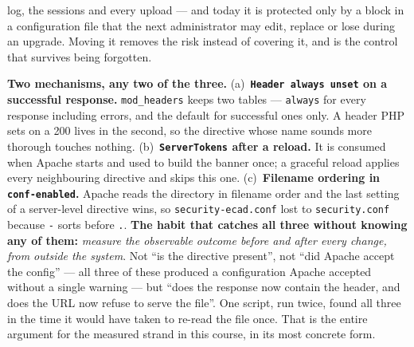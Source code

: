 \begin{ans}
        log, the sessions and every upload --- and today it is protected only
        by a block in a configuration file that the next administrator may
        edit, replace or lose during an upgrade. Moving it removes the risk
        instead of covering it, and is the control that survives being
        forgotten.
  \item \textbf{Two mechanisms, any two of the three.}
        (a)~\textbf{\texttt{Header always unset} on a successful response.}
        \texttt{mod\_headers} keeps two tables --- \texttt{always} for every
        response including errors, and the default for successful ones only.
        A header PHP sets on a 200 lives in the second, so the directive whose
        name sounds more thorough touches nothing.
        (b)~\textbf{\texttt{ServerTokens} after a reload.} It is consumed when
        Apache starts and used to build the banner once; a graceful reload
        applies every neighbouring directive and skips this one.
        (c)~\textbf{Filename ordering in \texttt{conf-enabled}.} Apache reads
        the directory in filename order and the last setting of a server-level
        directive wins, so \texttt{security-ecad.conf} lost to
        \texttt{security.conf} because \texttt{-} sorts before \texttt{.}.
        \textbf{The habit that catches all three without knowing any of them:}
        \emph{measure the observable outcome before and after every change, from
        outside the system}. Not ``is the directive present'', not ``did Apache
        accept the config'' --- all three of these produced a configuration
        Apache accepted without a single warning --- but ``does the response
        now contain the header, and does the URL now refuse to serve the
        file''. One script, run twice, found all three in the time it would
        have taken to re-read the file once. That is the entire argument for
        the measured strand in this course, in its most concrete form.
\end{ans}

